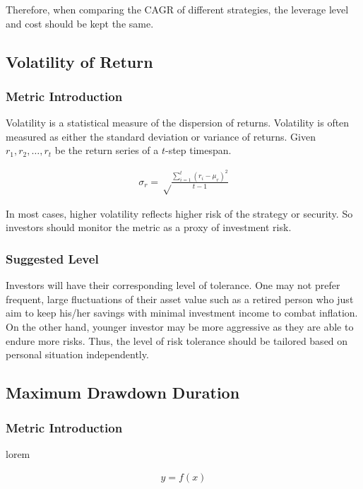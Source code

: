 \documentclass[12pt]{article}
\begin{document}
Therefore, when comparing the CAGR of different strategies, the leverage level and cost should be kept the same.

\subsection{Volatility of Return}

\subsubsection*{Metric Introduction}

Volatility is a statistical measure of the dispersion of returns. Volatility is often measured as either the standard deviation or variance of returns. Given $r_1, r_2, \dots , r_t$ be the return series of a $t$-step timespan.

\begin{align*}
  \sigma_r = \sqrt\frac{\sum_{i=1}^t (r_i-\mu_r)^2}{t-1}
\end{align*}

In most cases, higher volatility reflects higher risk of the strategy or security. So investors should monitor the metric as a proxy of investment risk.

\subsubsection*{Suggested Level}

Investors will have their corresponding level of tolerance. One may not prefer frequent, large fluctuations of their asset value such as a retired person who just aim to keep his/her savings with minimal investment income to combat inflation. On the other hand, younger investor may be more aggressive as they are able to endure more risks. Thus, the level of risk tolerance should be tailored based on personal situation independently.

\subsection{Maximum Drawdown Duration}

\subsubsection*{Metric Introduction}

lorem

\begin{align*}
  y = f(x)
\end{align*}
\end{document}
